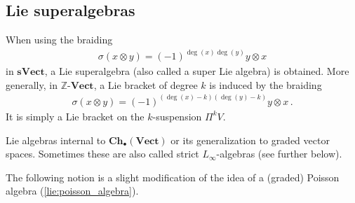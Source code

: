 \subsection{Lie superalgebras}

    \begin{example}\label{hda:lie_superalgebra}
        When using the braiding
        \begin{gather}
            \sigma(x\otimes y) = (-1)^{\deg(x)\deg(y)}y\otimes x
        \end{gather}
        in $\mathbf{sVect}$, a Lie superalgebra (also called a super Lie algebra) is obtained. More generally, in $\mathbb{Z}$-$\mathbf{Vect}$, a Lie bracket of degree $k$ is induced by the braiding
        \begin{gather}
            \sigma(x\otimes y) = (-1)^{(\deg(x)-k)(\deg(y)-k)}y\otimes x\,.
        \end{gather}
        It is simply a Lie bracket on the $k$-suspension $\Pi^kV$.
    \end{example}
    \begin{example}
        Lie algebras internal to $\mathbf{Ch_\bullet(Vect)}$ or its generalization to graded vector spaces. Sometimes these are also called strict $L_\infty$-algebras (see further below).
    \end{example}

    The following notion is a slight modification of the idea of a (graded) Poisson algebra (\cref{lie:poisson_algebra}).

